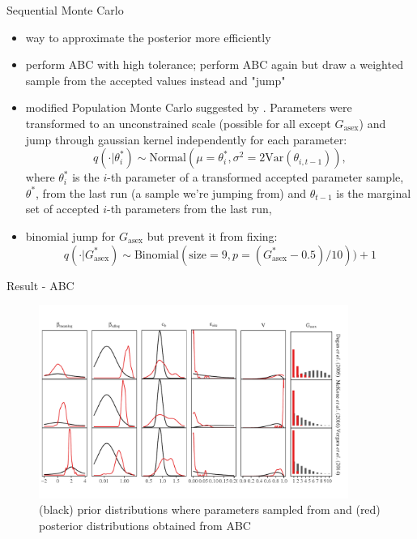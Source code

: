 \documentclass{beamer}
\begin{document}
\begin{frame}{Sequential Monte Carlo}
\begin{itemize}
    \item way to approximate the posterior more efficiently
    \item perform ABC with high tolerance; perform ABC again but draw a weighted sample from the accepted values instead and "jump"
    \item modified Population Monte Carlo suggested by \cite{turner2012tutorial}. Parameters were transformed to an unconstrained scale (possible for all except $G_{\textrm{asex}}$) and jump through gaussian kernel independently for each parameter:
    $$
    q(\cdot | \theta_i^\ast) \sim \mathrm{Normal}(\mu = \theta_i^\ast, \sigma^2 = 2\mathrm{Var}(\theta_{i, t-1})),
    $$
    where $\theta_i^\ast$ is the $i$-th parameter of a transformed accepted parameter sample, $\theta^\ast$, from the last run (a sample we're jumping from) and $\theta_{t-1}$ is the marginal set of accepted $i$-th parameters from the last run,
    \item binomial jump for $G_{\textrm{asex}}$ but prevent it from fixing:
    $$
    q(\cdot | G_{\textrm{asex}}^\ast) \sim \mathrm{Binomial}(\textrm{size}=9, p=(G_{\textrm{asex}}^\ast-0.5)/10)) + 1
    $$
\end{itemize}
\end{frame}

\begin{frame}{Result - ABC}
\begin{figure}
\vspace{-1em}
\includegraphics[width=0.9\textwidth]{../fig/smc_param.pdf}
\caption{(black) prior distributions where parameters sampled from and (red) posterior distributions obtained from ABC}
\vspace{-1em}
\end{figure}
\end{frame}
\end{document}
